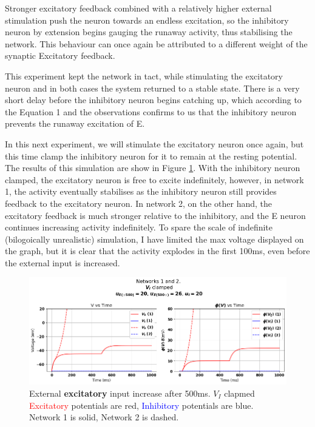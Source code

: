 \documentclass[10pt,twocolumn]{article}
\begin{document}
Stronger excitatory feedback combined with a relatively higher external
stimulation push the neuron towards an endless excitation, so the
inhibitory neuron by extension begins gauging the runaway activity,
thus stabilising the network. This behaviour can once again be
attributed to a different weight of the synaptic Excitatory feedback.

This experiment kept the network in tact, while stimulating the
excitatory neuron and in both cases the system returned to a
stable state. There is a very short delay before the inhibitory
neuron begins catching up, which according to the Equation 1 and
the observations confirms to us that the inhibitory neuron prevents
the runaway excitation of E.

In this next experiment, we will stimulate
the excitatory neuron once again, but this time clamp the inhibitory
neuron for it to remain at the resting potential. The results of this
simulation are show in Figure \ref{fig:e-input-clamped}.
With the inhibitory neuron clamped, the excitatory neuron is free to
excite indefinitely, however, in network 1, the activity eventually stabilises
as the inhibitory neuron still provides feedback to the excitatory neuron.
In network 2, on the other hand, the excitatory feedback is much stronger
relative to the inhibitory, and the E neuron continues increasing activity
indefinitely. To spare the scale of indefinite (bilogoically unrealistic) 
simulation, I have limited the max voltage displayed on the graph, but it is
clear that the activity explodes in the first 100ms, even before the 
external input is increased.

\begin{figure}
    \centering
    \captionsetup{justification=centering}
    \includegraphics[width=1\textwidth]{images/12-E_input_V_I_clamped.png}
    \caption{External \textbf{excitatory} input increase after 500ms. $V_I$ clapmed \hspace{\textwidth}
        \textcolor{red}{Excitatory} potentials are red, \textcolor{blue}{Inhibitory} potentials are blue.\hspace{\textwidth}
        Network 1 is solid, Network 2 is dashed.}
    \label{fig:e-input-clamped}
\end{figure}
\end{document}
